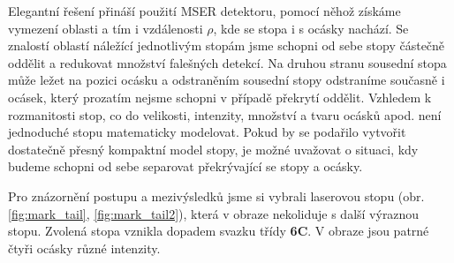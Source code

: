 	Elegantní řešení přináší použití MSER detektoru, pomocí něhož získáme vymezení oblasti a tím i vzdálenosti $\rho$, kde se stopa i s ocásky nachází. Se znalostí oblastí náležící jednotlivým stopám jsme schopni od sebe stopy částečně oddělit a redukovat množství falešných detekcí. Na druhou stranu sousední stopa může ležet na pozici ocásku a odstraněním sousední stopy odstraníme současně i ocásek, který prozatím nejsme schopni v případě překrytí oddělit. Vzhledem k rozmanitosti stop, co do velikosti, intenzity, množství a tvaru ocásků apod. není jednoduché stopu matematicky modelovat. Pokud by se podařilo vytvořit dostatečně přesný kompaktní model stopy, je možné uvažovat o situaci, kdy budeme schopni od sebe separovat překrývající se stopy a ocásky. 
	
 Pro znázornění postupu a mezivýsledků jsme si vybrali laserovou stopu (obr. \ref{fig:mark_tail}, \ref{fig:mark_tail2}), která v obraze nekoliduje s další výraznou stopu. Zvolená stopa vznikla dopadem svazku třídy \textbf{6C}. V obraze jsou patrné čtyři ocásky různé intenzity. 
	

